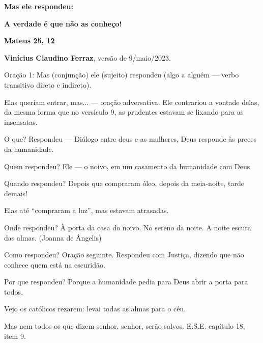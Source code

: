 \documentclass{rbfin}
\begin{document}
\shorttitle{$\,$} %
\rbfe{}
\autor{$\,$}

$\,$

\vspace{40mm}

\Huge

\begin{center}
\textbf{Mas ele respondeu:}

\textbf{A verdade é que não as conheço!}

\textbf{Mateus 25, 12}

\end{center}

\vspace{90mm}

\Large

\begin{flushright}
\textbf{Vinícius Claudino Ferraz}, versão de 9/maio/2023.
\end{flushright}

\LARGE

\newpage

\doublespacing

Oração 1: Mas (conjunção) ele (sujeito) respondeu (algo a alguém --- verbo transitivo direto e indireto).

Elas queriam entrar, mas... --- oração adversativa. Ele contrariou a vontade delas, da mesma forma que no versículo 9, as prudentes estavam se lixando para as insensatas.

O que? Respondeu --- Diálogo entre deus e as mulheres, Deus responde às preces da humanidade.

Quem respondeu? Ele --- o noivo, em um casamento da humanidade com Deus.

Quando respondeu? Depois que compraram óleo, depois da meia-noite, tarde demais! 

Elas até ``compraram a luz'', mas estavam atrasadas.

Onde respondeu? À porta da casa do noivo. No sereno da noite. A noite escura das almas. (Joanna de Ângelis)

Como respondeu? Oração seguinte. Respondeu com Justiça, dizendo que não conhece quem está na escuridão.

Por que respondeu? Porque a humanidade pedia para Deus abrir a porta para todos.

Vejo os católicos rezarem: levai todas as almas para o céu.

Mas nem todos os que dizem senhor, senhor, serão salvos. E.S.E. capítulo 18, item 9.
\end{document}
